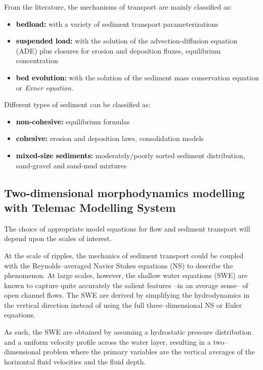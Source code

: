 \noindent
From the literature, the mechanisms of transport are mainly classified as:
\begin{itemize}
\item \textcolor{black}{\bf bedload:} with a variety of sediment transport parameterizations
\item \textcolor{black}{\bf suspended load:} with the solution of the advection-diffusion equation (ADE) plus closures for erosion and deposition fluxes, equilibrium concentration
\item \textcolor{black}{\bf bed evolution:} with the solution of the sediment mass conservation equation or \textit{Exner equation}.
\end{itemize}

\noindent
Different types of sediment can be classified as:
\begin{itemize}
\item \textcolor{black}{\bf non-cohesive:} equilibrium formulas
\item \textcolor{black}{\bf cohesive:} erosion and deposition laws, consolidation models
\item \textcolor{black}{\bf mixed-size sediments:} moderately/poorly sorted sediment distribution, sand-gravel and sand-mud mixtures
\end{itemize}
\noindent


\subsection{Two-dimensional morphodynamics modelling with Telemac Modelling System}
The choice of appropriate model equations for flow and sediment transport
will depend upon the scales of interest. 

At the scale of ripples, the mechanics of sediment transport could be coupled with the
Reynolds--averaged Navier Stokes equations (NS) to describe the phenomenon.
At large scales, however, the shallow water equations (SWE) are known to
capture quite accurately the salient features --in an average sense-- of 
open channel flows. The SWE are derived by simplifying the hydrodynamics in the vertical
direction instead of using the full three--dimensional NS or Euler
equations.

As such, the SWE are obtained by assuming a hydrostatic pressure
distribution and a uniform velocity profile across the water layer,
resulting in a two--dimensional problem where the primary variables are the
vertical averages of the horizontal fluid velocities and the fluid depth.

